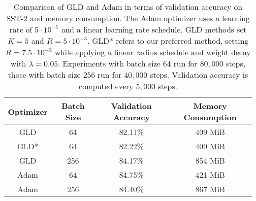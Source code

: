 \begin{table}
    \centering
    \caption [Comparison of GLD and Adam in terms of 
    validation accuracy on SST-2 and memory consumption]
    {Comparison of GLD and Adam in terms of 
    validation accuracy on SST-2 and memory consumption.
    The Adam optimizer
    uses a learning rate of $5 \cdot 10^{-5}$ and a linear
    learning rate schedule. GLD methods set $K=5$ and
    $R = 5 \cdot 10^{-3}$. GLD* refers to our preferred 
    method, setting $R = 7.5 \cdot 10^{-3}$ while
    applying a linear radius schedule and 
    weight decay with $\lambda = 0.05$.
    Experiments with batch size 64
    run for $80,000$ steps, those with batch size 256 
    run for $40,000$ steps. Validation accuracy is 
    computed every $5,000$ steps.
    }
    \label{table:results}
    \bigskip
    \begin{tabular}{c c c c}
        \toprule
        \textbf{Optimizer} & \textbf{Batch Size} & \textbf{Validation Accuracy} & \textbf{Memory Consumption} \\
        \midrule
        GLD & 64 & 82.11\% & 409 MiB \\
        GLD* & 64 & 82.22\% & 409 MiB \\
        GLD & 256 & 84.17\% & 854 MiB \\
        Adam & 64 & 84.75\% & 421 MiB \\
        Adam & 256 & 84.40\% & 867 MiB \\
        \bottomrule
    \end{tabular}
\end{table}

